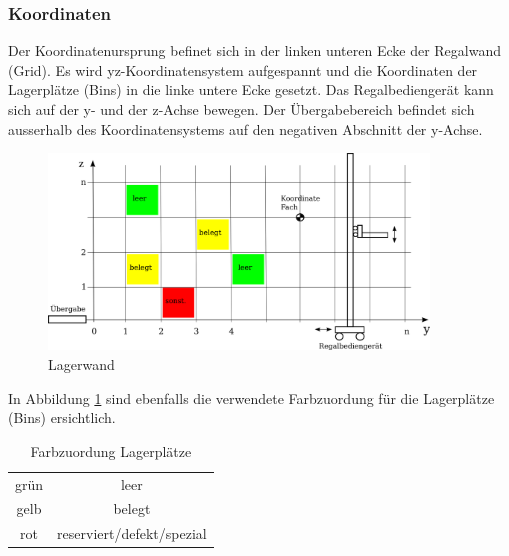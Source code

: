 \subsubsection{Koordinaten}
Der Koordinatenursprung befinet sich in der linken unteren Ecke der Regalwand (Grid). Es wird yz-Koordinatensystem aufgespannt und die Koordinaten der Lagerplätze (Bins) in die linke untere Ecke gesetzt. Das Regalbediengerät kann sich auf der y- und der z-Achse bewegen. Der Übergabebereich befindet sich ausserhalb des Koordinatensystems auf den negativen Abschnitt der y-Achse. 
%
\begin{figure}[h]
  \begin{center}
    \includegraphics[width=0.9\textwidth]{images/koordinaten-wand.png}
    \caption{Lagerwand}
    \label{fig:wand}
  \end{center}
\end{figure}
%
In Abbildung \ref{fig:wand} sind ebenfalls die verwendete Farbzuordung für die Lagerplätze (Bins) ersichtlich.
%
\begin{table}
  \caption{Farbzuordung Lagerplätze}
  \label{tab:bin-color}

  \begin{center}
    \begin{tabular}{cc}
       grün & leer\\
       gelb & belegt\\
       rot & reserviert/defekt/spezial \\
    \end{tabular}
  \end{center}
\end{table}

%
